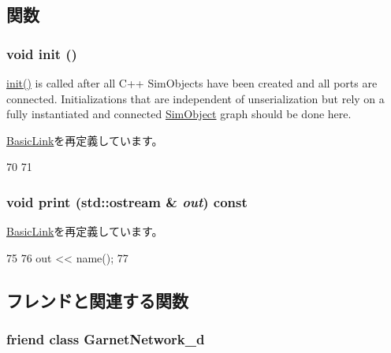 \subsection{関数}
\hypertarget{classGarnetExtLink__d_a02fd73d861ef2e4aabb38c0c9ff82947}{
\subsubsection[{init}]{\setlength{\rightskip}{0pt plus 5cm}void init ()}}
\label{classGarnetExtLink__d_a02fd73d861ef2e4aabb38c0c9ff82947}
\hyperlink{classGarnetExtLink__d_a02fd73d861ef2e4aabb38c0c9ff82947}{init()} is called after all C++ SimObjects have been created and all ports are connected. Initializations that are independent of unserialization but rely on a fully instantiated and connected \hyperlink{classSimObject}{SimObject} graph should be done here. 

\hyperlink{classBasicLink_a02fd73d861ef2e4aabb38c0c9ff82947}{BasicLink}を再定義しています。


\begin{DoxyCode}
70 {
71 }
\end{DoxyCode}
\hypertarget{classGarnetExtLink__d_ac55fe386a101fbae38c716067c9966a0}{
\subsubsection[{print}]{\setlength{\rightskip}{0pt plus 5cm}void print (std::ostream \& {\em out}) const}}
\label{classGarnetExtLink__d_ac55fe386a101fbae38c716067c9966a0}


\hyperlink{classBasicLink_ac55fe386a101fbae38c716067c9966a0}{BasicLink}を再定義しています。


\begin{DoxyCode}
75 {
76     out << name();
77 }
\end{DoxyCode}


\subsection{フレンドと関連する関数}
\hypertarget{classGarnetExtLink__d_a38cee00c4f7913bbde36a9724f8d4075}{
\subsubsection[{GarnetNetwork\_\-d}]{\setlength{\rightskip}{0pt plus 5cm}friend class {\bf GarnetNetwork\_\-d}}}
\label{classGarnetExtLink__d_a38cee00c4f7913bbde36a9724f8d4075}


